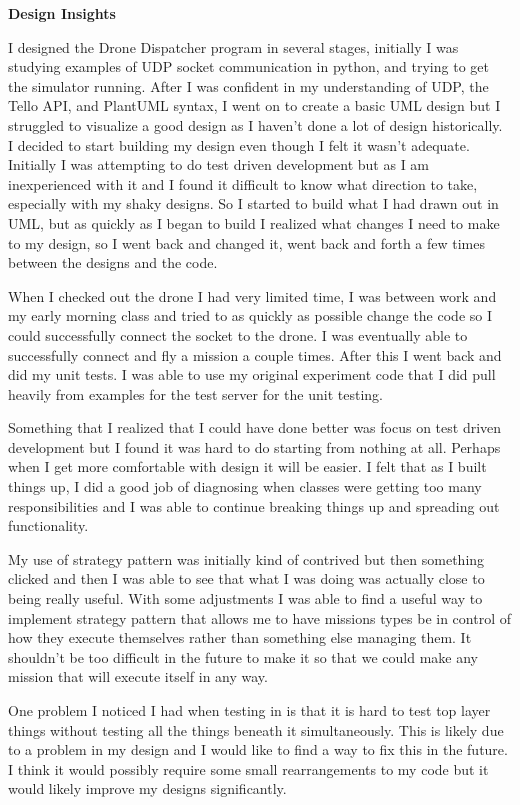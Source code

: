 \documentclass[12pt]{article}
\begin{document}
\begingroup
      \fontsize{14pt}{12pt}\selectfont

      \centerline{\textbf{Design Insights}} \par
\endgroup

I designed the Drone Dispatcher program in several stages, initially I was studying examples of UDP socket communication in python, and trying to get
the simulator running. After I was confident in my understanding of UDP, the Tello API, and PlantUML syntax, I went on to create a basic UML design but I struggled 
to visualize a good design as I haven't done a lot of design historically. I decided to start building my design even though I felt it wasn't adequate.
Initially I was attempting to do test driven development but as I am inexperienced with it and I found it difficult to know what direction to take, especially with my shaky designs.
So I started to build what I had drawn out in UML, but as quickly as I began to build I realized what changes I need to make to my design, so I went back and changed it, went back and forth a few
times between the designs and the code.

When I checked out the drone I had very limited time, I was between work and my early morning class and tried to as quickly as possible change the code so I could successfully connect the socket to the drone. I was eventually able to successfully connect and fly a mission a couple times. After this I went back and did my unit tests. I was able to use my original experiment code that I did pull heavily from examples
for the test server for the unit testing.

Something that I realized that I could have done better was focus on test driven development but I found it was hard to do starting from nothing at all. Perhaps when 
I get more comfortable with design it will be easier. I felt that as I built things up, I did a good job of diagnosing when classes were getting too many responsibilities and I was able to continue breaking things up and spreading out functionality.

My use of strategy pattern was initially kind of contrived but then something clicked and then I was able to see that what I was
doing was actually close to being really useful. With some adjustments I was able to find a useful way to implement strategy pattern that
allows me to have missions types be in control of how they execute themselves rather than something else managing them. It shouldn't be too
difficult in the future to make it so that we could make any mission that will execute itself in any way.

One problem I noticed I had when testing in is that it is hard to test top layer things without testing all the things beneath it simultaneously. This is likely due to a problem in my design and I would like to find a way to fix this in the future. I think it would possibly require some small rearrangements to my code but it would likely improve my designs significantly. 
\end{document}
